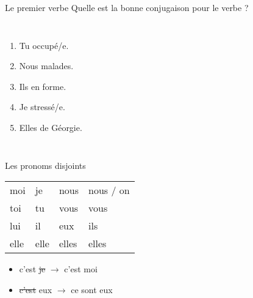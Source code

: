 \documentclass{beamer}
\begin{document}
  \begin{frame}{Le premier verbe }
    Quelle est la bonne conjugaison pour le verbe ? \\
    \begin{columns}
        \begin{enumerate}
          \item Tu \underline{} occupé/e.
          \item Nous \underline{} malades.
          \item Ils \underline{} en forme.
          \item Je \underline{} stressé/e.
          \item Elles \underline{} de Géorgie.
        \end{enumerate}
        \begin{minipage}[c][0.6\textheight]{\linewidth}
          \begin{center}
          \end{center}
        \end{minipage}
    \end{columns}
  \end{frame}

  \begin{frame}{Les pronoms disjoints}
    \begin{center}
      \begin{tabular}{l l l l}
        \alert{moi}  & je   & \alert{nous}  & nous / on \\
        \alert{toi}  & tu   & \alert{vous}  & vous \\
        \alert{lui}  & il   & \alert{eux}   & ils \\
        \alert{elle} & elle & \alert{elles} & elles \\
      \end{tabular}
    \end{center}
    \begin{itemize}
      \item c'est \sout{je} $\to$ c'est \alert{moi}
      \item \sout{c'est} eux $\to$ \alert{ce sont} eux
    \end{itemize}
  \end{frame}
\end{document}
